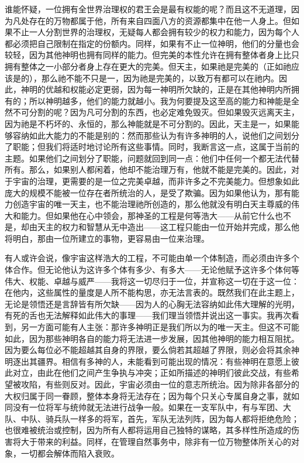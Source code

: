 谁能怀疑，一位拥有全世界治理权的君王会是最有权能的呢？而且这不无道理，因为凡处存在的万物都属于他，所有来自四面八方的资源都集中在他一人身上。但如果不止一人分割世界的治理权，无疑每人都会拥有较少的权力和能力，因为每个人都必须把自己限制在指定的份额内。同样，如果有不止一位神明，他们的分量也会较轻，因为其他神明也拥有同样的能力。但完美的本性允许在拥有整体者身上比只拥有整体之一小部分者身上存在更大的完美。但天主，如果祂是完美的（正如祂应该是的），那么祂不能不只是一，因为祂是完美的，以致万有都可以在祂内。因此，神明的优越和权能必定更弱，因为每一神明所欠缺的，正是在其他神明内所拥有的；所以神明越多，他们的能力就越小。我为何要提及这至高的能力和神能是全然不可分割的呢？因为凡可分割的东西，也必定难免毁灭。但如果毁灭远离天主，因为祂是不朽坏的、永恒的，那么神能就是不可分割的。因此，天主是一，如果能够容纳如此大能力的不能是别的：然而那些认为有许多神明的人，说他们之间划分了职能；但我们将适时地讨论所有这些事情。同时，我断言这一点，这属于当前的主题。如果他们之间划分了职能，问题就回到同一点：他们中任何一个都无法代替所有。那么，如果别人都闲着，他却不能治理万有，他就不能是完美的。因此，对于宇宙的治理，更需要的是一位之完美卓越，而非许多之不完美能力。但想象如此庞大的规模不能被一位存在者所统治的人，是受了欺骗。因为如果他认为，那有能力创造宇宙的唯一天主，也不能治理祂所创造的，那么他就没有明白天主尊威的伟大和能力。但如果他在心中领会，那神圣的工程是何等浩大——从前它什么也不是，却由天主的权力和智慧从无中造出——这工程只能由一位开始并完成，那么他将明白，那由一位所建立的事物，更容易由一位来治理。\par

有人或许会说，像宇宙这样浩大的工程，不可能由单一个体制造，而必须由许多个体合作。但无论他认为这许多个体有多少、有多大——无论他赋予这许多个体何等伟大、权能、卓越与威严——我将这一切尽归于一位，并宣称这一切在于这一位：在他内，这些属性的量度是人所不能构思，亦无法言表的。既然我们在此主题上，无论是领悟还是言辞皆有所欠缺——因为人的心胸无法容纳如此伟大理解的光明，有死的舌也无法解释如此伟大的事理——我们理当领悟并说出这一事实。我再次看到，另一方面可能有人主张：那许多神明正是我们所以为的唯一天主。但这不可能如此，因为那些神明各自的能力将无法进一步发展，因其他神明的能力相互阻扰。因为要么每位必不能超越其自身的界限，要么倘若其超越了界限，则必会将其余神明逐出其疆界。相信有多神的人，未能看到可能出现的情况：有些神明在意愿上彼此对立，由此在他们之间产生争执与冲突；正如所描述的神明们彼此交战，有些希望被攻陷，有些则反对。因此，宇宙必须由一位的意志所统治。因为除非各部分的大权归属于同一眷顾，整体本身将无法存在；因为每个只关心专属自身之事，就如同没有一位将军与统帅就无法进行战争一般。如果在一支军队中，有与军团、大队、中队、骑兵队一样多的将军，首先，军队无法列阵，因为每人都将拒绝危险；也很难被统治或控制，因为所有人都将运用自己独特的谋略，其多样性所造成的伤害将大于带来的利益。同样，在管理自然事务中，除非有一位万物整体所关心的对象，一切都会解体而陷入衰败。\par

